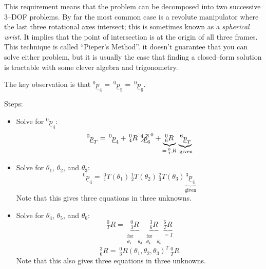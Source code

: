 \documentclass[]{article}
\newcommand{\crossout}[1]{\mathbin{\ooalign{${#1}$\cr\larger[1]{$\nearrow$}\cr}}}
\begin{document}
This requirement means that the problem can be decomposed into two successive 3--DOF problems. By far the most common case is a revolute manipulator where the last three rotational axes intersect; this is sometimes known as a \textit{spherical wrist}. It implies that the point of intersection is at the origin of all three frames. This technique is called ``Pieper's Method''. it doesn't guarantee that you can solve either problem, but it is usually the case that finding a closed--form solution is tractable with some clever algebra and trigonometry. 
 
 The key observation is that $^{0}\underline{p}_{4} = \ \!^{0}\underline{p}_{5} = \ \!^{0}\underline{p}_{6}$.
 
 \begin{samepage}
 Steps:
 \begin{itemize}
 	\item Solve for $^{0}\underline{p}_{4}$:
 	\begin{displaymath} ^{0}\underline{p}_{T} = \ \!^{0}\underline{p}_{4} + \ \!^{0}_{4}R\ \!\crossout{^{4}\underline{p}_{6}}^{0} + \underbrace{^{0}_{6}R}_{=\ \!^{0}_{T}R}\underbrace{\ \!^{6}\underline{p}_{T}}_{\text{\ given}} \end{displaymath}
 	\item Solve for $\theta_{1}$, $\theta_{2}$, and $\theta_{3}$:
 	\begin{displaymath} ^{0}\underline{p}_{4} = \ \!^{0}_{1}T(\theta_{1})\ \!^{1}_{2}T(\theta_{2})\ \!^{2}_{3}T(\theta_{3})\underbrace{^{3}\underline{p}_{4}}_{\text{given}} \end{displaymath}
 	Note that this gives three equations in three unknowns.
 	\item Solve for $\theta_{4}$, $\theta_{5}$, and $\theta_{6}$:
 	\begin{displaymath}
 	^{0}_{T}R = \underbrace{^{0}_{3}R}_{\substack{\text{for}\\\theta_{1}-\theta_{3}}}\underbrace{^{3}_{6}R}_{\substack{\text{for}\\\theta_{4}-\theta_{6}}}\underbrace{^{6}_{T}R}_{=I}
 	\end{displaymath}
 	\begin{displaymath}
 		^{3}_{6}R = \ \!^{0}_{3}R(\theta_{1}, \theta_{2}, \theta_{3})^{T}\ \!^{0}_{T}R
 	\end{displaymath}
 	Note that this also gives three equations in three unknowns.
 \end{itemize}
\end{samepage}
\end{document}
